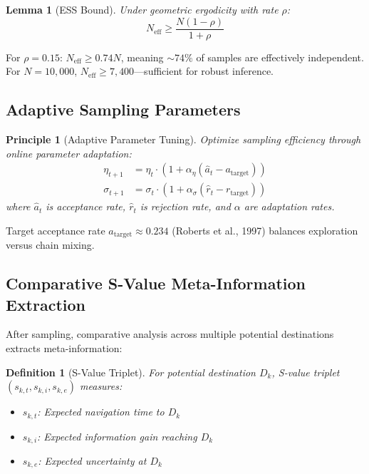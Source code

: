\documentclass[12pt,a4paper]{article}
\newtheorem{lemma}{Lemma}
\newtheorem{definition}{Definition}
\newtheorem{principle}{Principle}
\begin{document}
\begin{lemma}[ESS Bound]
Under geometric ergodicity with rate $\rho$:
\begin{equation}
N_{\text{eff}} \geq \frac{N(1-\rho)}{1+\rho}
\end{equation}
\end{lemma}

For $\rho = 0.15$: $N_{\text{eff}} \geq 0.74 N$, meaning $\sim 74\%$ of samples are effectively independent. For $N = 10,000$, $N_{\text{eff}} \geq 7,400$—sufficient for robust inference.

\subsection{Adaptive Sampling Parameters}

\begin{principle}[Adaptive Parameter Tuning]
Optimize sampling efficiency through online parameter adaptation:
\begin{align}
\eta_{t+1} &= \eta_t \cdot (1 + \alpha_\eta (\hat{a}_t - a_{\text{target}})) \\
\sigma_{t+1} &= \sigma_t \cdot (1 + \alpha_\sigma (\hat{r}_t - r_{\text{target}}))
\end{align}
where $\hat{a}_t$ is acceptance rate, $\hat{r}_t$ is rejection rate, and $\alpha$ are adaptation rates.
\end{principle}

Target acceptance rate $a_{\text{target}} \approx 0.234$ (Roberts et al., 1997) balances exploration versus chain mixing.

\subsection{Comparative S-Value Meta-Information Extraction}

After sampling, comparative analysis across multiple potential destinations extracts meta-information:

\begin{definition}[S-Value Triplet]
For potential destination $D_k$, S-value triplet $(s_{k,t}, s_{k,i}, s_{k,e})$ measures:
\begin{itemize}
\item $s_{k,t}$: Expected navigation time to $D_k$
\item $s_{k,i}$: Expected information gain reaching $D_k$
\item $s_{k,e}$: Expected uncertainty at $D_k$
\end{itemize}
\end{definition}
\end{document}
